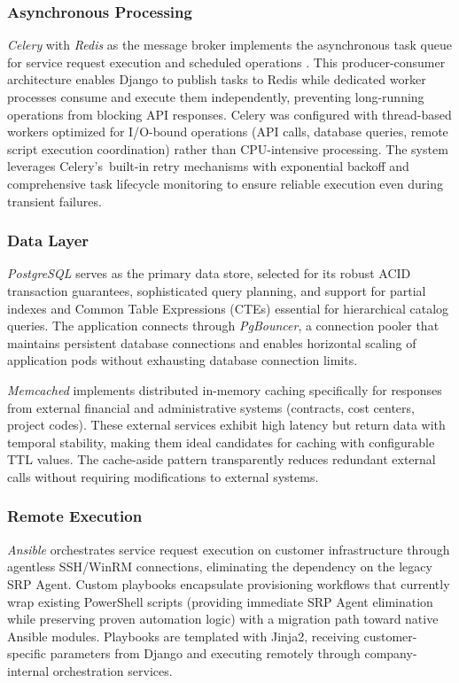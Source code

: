 \subsubsection{Asynchronous Processing}

\textit{Celery} with \textit{Redis} as the message broker implements the asynchronous task queue for service request execution and scheduled operations \cite{celery}. This producer-consumer architecture enables Django to publish tasks to Redis while dedicated worker processes consume and execute them independently, preventing long-running operations from blocking API responses. Celery was configured with thread-based workers optimized for I/O-bound operations (API calls, database queries, remote script execution coordination) rather than CPU-intensive processing. The system leverages Celery's~built-in retry mechanisms with exponential backoff and comprehensive task lifecycle monitoring to ensure reliable execution even during transient failures.

\subsubsection{Data Layer}

\textit{PostgreSQL} serves as the primary data store, selected for its robust ACID transaction guarantees, sophisticated query planning, and support for partial indexes and Common Table Expressions (CTEs) essential for hierarchical catalog queries. The application connects through \textit{PgBouncer}, a connection pooler that maintains persistent database connections and enables horizontal scaling of application pods without exhausting database connection limits.

\textit{Memcached} implements distributed in-memory caching specifically for responses from external financial and administrative systems (contracts, cost centers, project codes). These external services exhibit high latency but return data with temporal stability, making them ideal candidates for caching with configurable TTL values. The cache-aside pattern transparently reduces redundant external calls without requiring modifications to external systems.

\subsubsection{Remote Execution}

\textit{Ansible} orchestrates service request execution on customer infrastructure through agentless SSH/WinRM connections, eliminating the dependency on the legacy SRP Agent. Custom playbooks encapsulate provisioning workflows that currently wrap existing PowerShell scripts (providing immediate SRP Agent elimination while preserving proven automation logic) with a migration path toward native Ansible modules. Playbooks are templated with Jinja2, receiving customer-specific parameters from Django and executing remotely through company-internal orchestration services.

